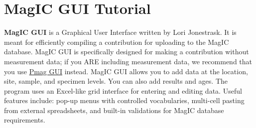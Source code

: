 \documentclass[11pt]{book}
\begin{document}
{%



\chapter{MagIC GUI Tutorial}
\label{chap:MagIC GUI}

{\bf MagIC GUI} is a Graphical User Interface written by Lori Jonestrask.  It is meant for efficiently compiling a contribution for uploading to the MagIC database.  MagIC GUI is specifically designed for making a contribution without measurement data; if you ARE including measurement data, we recommend that you use \href{#pmag_gui.py}{Pmag GUI} instead.
MagIC GUI allows you to add data at the location, site, sample, and specimen levels.  You can also add results and ages.  The program uses an Excel-like grid interface for entering and editing data.  Useful features include: pop-up menus with controlled vocabularies, multi-cell pasting from external spreadsheets, and built-in validations for MagIC database requirements.


}
\end{document}
